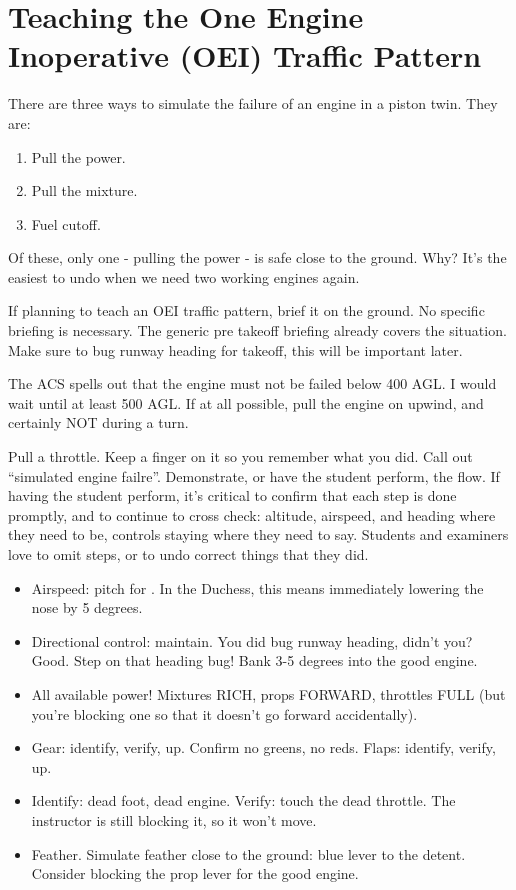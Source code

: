\section{Teaching the One Engine Inoperative (OEI) Traffic Pattern}

There are three ways to simulate the failure of an engine in a piston twin. They are:

\begin{enumerate}
    \item Pull the power.
    \item Pull the mixture.
    \item Fuel cutoff.
\end{enumerate}

Of these, only one - pulling the power - is safe close to the ground. Why? It's the easiest to undo when we need
two working engines again.

If planning to teach an OEI traffic pattern, brief it on the ground. No specific briefing is necessary. The generic
pre takeoff briefing already covers the situation. Make sure to bug runway heading for takeoff, this will be important later.

The ACS spells out that the engine must not be failed below 400 AGL. I would wait until at least 500 AGL. If at all
possible, pull the engine on upwind, and certainly NOT during a turn.

Pull a throttle. Keep a finger on it so you remember what you did. Call out ``simulated engine failre''. Demonstrate,
or have the student perform, the flow. If having the student perform, it's critical to confirm that each step is done
promptly, and to continue to cross check: altitude, airspeed, and heading where they need to be, controls staying where they need
to say. Students and examiners love to omit steps, or to undo correct things that they did.

\begin{itemize}
    \item Airspeed: pitch for \vyse. In the Duchess, this means immediately lowering the nose by 5 degrees.
    \item Directional control: maintain. You did bug runway heading, didn't you? Good. Step on that heading bug! Bank 3-5 degrees into the good engine.
    \item All available power! Mixtures RICH, props FORWARD, throttles FULL (but you're blocking one so that it doesn't go forward accidentally).
    \item Gear: identify, verify, up. Confirm no greens, no reds. Flaps: identify, verify, up.
    \item Identify: dead foot, dead engine. Verify: touch the dead throttle. The instructor is still blocking it, so it won't move.
    \item Feather. Simulate feather close to the ground: blue lever to the detent. Consider blocking the prop lever for the good engine.
\end{itemize}


